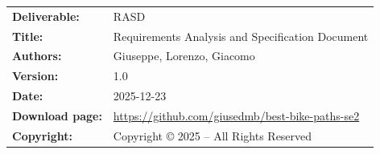 \documentclass{Configuration_Files/PoliMi3i_thesis}
\begin{document}

\pagestyle{empty} %
\frontmatter %



\begin{table}[h!]
    \begin{tabu} to \textwidth { X[0.3,r,p] X[0.7,l,p] }
        \hline

        \textbf{Deliverable:}   & RASD                                                                      \\
        \textbf{Title:}         & Requirements Analysis and Specification Document                          \\
        \textbf{Authors:}       & Giuseppe, Lorenzo, Giacomo                  \\
        \textbf{Version:}       & 1.0                                                                       \\
        \textbf{Date:}          & 2025-12-23                                                                \\
        \textbf{Download page:} & \url{https://github.com/giusedmb/best-bike-paths-se2}              \\
        \textbf{Copyright:}     & Copyright © 2025 – All Rights Reserved                                    \\
        \hline
    \end{tabu}
\end{table}
\thispagestyle{empty} %
\end{document}
